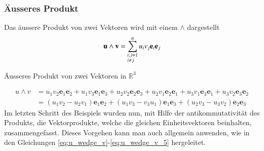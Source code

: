 \subsubsection{Äusseres Produkt}
Das äussere Produkt von zwei Vektoren wird mit einem $\wedge$ dargestellt
\begin{equation}
    \textbf{u}\wedge \textbf{v} 
    = 
    \sum_{\begin{subarray}{l}i,j=1\\i \neq j\end{subarray}}^n  u_iv_j\textbf{e}_i\textbf{e}_j 
\end{equation}
\begin{beispiel}
Äusseres Produkt von zwei Vektoren in $\mathbb{R}^3$
\end{beispiel}
\begin{equation}
    \begin{split}
        u \wedge v 
        &= 
        u_1v_2\textbf{e}_1\textbf{e}_2 
        + 
        u_1v_3\textbf{e}_1\textbf{e}_3 
        + 
        u_2v_2\textbf{e}_2\textbf{e}_3 
        + 
        u_2v_1\textbf{e}_2\textbf{e}_1 
        + 
        u_3v_1\textbf{e}_3\textbf{e}_1 
        +
        u_3v_2\textbf{e}_3\textbf{e}_2 \\\ 
        &= 
        (u_1v_2 - u_2v_1)\textbf{e}_1\textbf{e}_2 
        + 
        (u_1v_3 - v_3u_1)\textbf{e}_1\textbf{e}_3 
        + 
        (u_2v_3 - u_3v_2)\textbf{e}_2\textbf{e}_3
    \end{split}
\end{equation}
Im letzten Schritt des Beispiels wurden nun, mit Hilfe der antikommutativität des Produkts, die Vektorprodukte, welche die gleichen Einheitsvektoren beinhalten, zusammengefasst. Dieses Vorgehen kann man auch allgemein anwenden, wie in den Gleichungen \ref{eq:u_wedge_v}-\ref{eq:u_wedge_v_5} hergeleitet.
